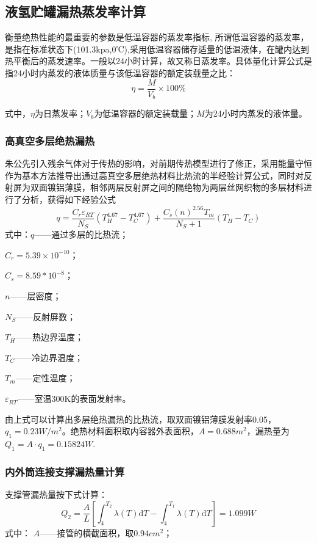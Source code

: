 \documentclass[UTF8,a4paper]{ctexart}
\newcommand{\upcite}[1]{\textsuperscript{\textsuperscript{\cite{#1}}}}
\begin{document}
	\subsection{液氢贮罐漏热蒸发率计算}
	衡量绝热性能的最重要的参数是低温容器的蒸发率指标, 所谓低温容器的蒸发率\upcite{ref16}，是指在标准状态下(101.3kpa,0℃),采用低温容器储存适量的低温液体，在罐内达到热平衡后的蒸发速率。一般以24小时计算，故又称日蒸发率。具体量化计算公式是指24小时内蒸发的液体质量与该低温容器的额定装载量之比：
	\begin{equation*}
		\eta=\dfrac{M}{V_{b}}\times 100\%
	\end{equation*}
	
	式中，$\eta$为日蒸发率；$V_{b}$为低温容器的额定装载量；$M$为24小时内蒸发的液体量。
	\subsubsection{高真空多层绝热漏热}
	朱公先\upcite{ref17}引入残余气体对于传热的影响，对前期传热模型进行了修正，采用能量守恒作为基本方法推导出通过高真空多层绝热材料比热流的半经验计算公式，同时对反射屏为双面镀铝薄膜，相邻两层反射屏之间的隔绝物为两层丝网织物的多层材料进行了分析，获得如下经验公式
	\begin{equation*}
	q=\dfrac{C_{r}\varepsilon_{RT}}{N_{S}}(T^{4.67}_{H}-T^{4.67}_{C})+\dfrac{C_{s}(n)^{2.56}T_{m}}{N_{S}+1}(T_{H}-T_{C})
	\end{equation*}
	式中：$q$——通过多层的比热流；
	
	$C_{r}=5.39\times10^{-10}$；
	
	$C_{s}=8.59*10^{-8}$；
	
	$n$——层密度；
	
	$N_{S}$——反射屏数；
	
	$T_{H}$——热边界温度；
	
	$T_{C}$——冷边界温度；
	
	$T_{m}$——定性温度；
	
	$\varepsilon_{RT}$——室温300K的表面发射率。
	
	由上式可以计算出多层绝热漏热的比热流，取双面镀铝薄膜发射率0.05，$q_{1}=0.23W/m^{2}$。绝热材料面积取内容器外表面积，$A=0.688m^{2}$，漏热量为$Q_{1}=A\cdot q_{1}=0.15824W$.
	\subsubsection{内外筒连接支撑漏热量计算}
	支撑管漏热量按下式计算\upcite{ref18}：
	\begin{equation*}
	Q_{2}=\dfrac{A}{L}
	\left[\int^{T_{2}}_{4}\lambda(T)\mathrm{d}T-\int^{T_{1}}_{4}\lambda(T)\mathrm{d}T\right]=1.099W
	\end{equation*}
	式中：
	$A$——接管的横截面积，取$0.94cm^2$；
	
\end{document}
